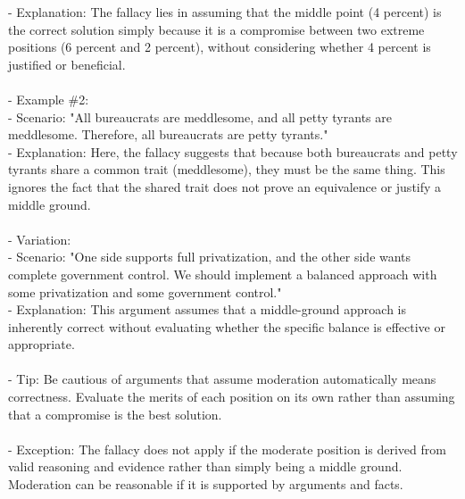 \documentclass[a4paper,12pt,single,pdftex]{scrbook}
\begin{document}
    
        - Explanation: The fallacy lies in assuming that the middle point (4 percent) is the correct solution simply because it is a compromise between two extreme positions (6 percent and 2 percent), without considering whether 4 percent is justified or beneficial.
    \\

    
      
    \\

    
      - Example \#2:
    \\

    
        - Scenario: "All bureaucrats are meddlesome, and all petty tyrants are meddlesome. Therefore, all bureaucrats are petty tyrants."
    \\

    
        - Explanation: Here, the fallacy suggests that because both bureaucrats and petty tyrants share a common trait (meddlesome), they must be the same thing. This ignores the fact that the shared trait does not prove an equivalence or justify a middle ground.
    \\

    
      
    \\

    
      - Variation:
    \\

    
        - Scenario: "One side supports full privatization, and the other side wants complete government control. We should implement a balanced approach with some privatization and some government control."
    \\

    
        - Explanation: This argument assumes that a middle-ground approach is inherently correct without evaluating whether the specific balance is effective or appropriate.
    \\

    
      
    \\

    
      - Tip: Be cautious of arguments that assume moderation automatically means correctness. Evaluate the merits of each position on its own rather than assuming that a compromise is the best solution.
    \\

    
      
    \\

    
      - Exception: The fallacy does not apply if the moderate position is derived from valid reasoning and evidence rather than simply being a middle ground. Moderation can be reasonable if it is supported by arguments and facts.
    \\
\end{document}
